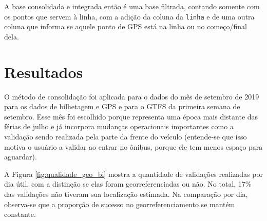 \documentclass[        
    a4paper,          %
    12pt,             %
    chapter=TITLE,    %
    section=Title,    %
    subsection=Title, %
    oneside,          %
    english,          %
    spanish,          %
    brazil,           %
    fleqn             %
]{abntex2}
\let\oldtexttt\texttt
\renewcommand{\texttt}[1]{
  \colorbox{bgcolor}{\oldtexttt{#1}}
}
\begin{document}
  A base consolidada e integrada então é uma base filtrada, contando somente com os pontos que servem à linha, com a adição da coluna da \texttt{linha} e de uma outra coluna que informa se aquele ponto de GPS está na linha ou no começo/final dela.
  
  \hypertarget{resultados}{%
  \section{Resultados}\label{resultados}}
  
  O método de consolidação foi aplicada para o dados do mês de setembro de 2019 para os dados de bilhetagem e GPS e para o GTFS da primeira semana de setembro. Esse mês foi escolhido porque representa uma época mais distante das férias de julho e já incorpora mudanças operacionais importantes como a validação sendo realizada pela parte da frente do veículo (entende-se que isso motiva o usuário a validar ao entrar no ônibus, porque ele tem menos espaço para aguardar).
  
  A Figura \ref{fig:qualidade_geo_bi} mostra a quantidade de validações realizadas por dia útil, com a distinção se elas foram georreferenciadas ou não. No total, 17\% das validações não tiveram sua localização estimada. Na comparação por dia, observa-se que a proporção de sucesso no georreferenciamento se mantém constante.
  
  \begin{figure}[!h]
  \captionsetup{width=16cm}
  \centering
  \end{figure}
  
\end{document}
